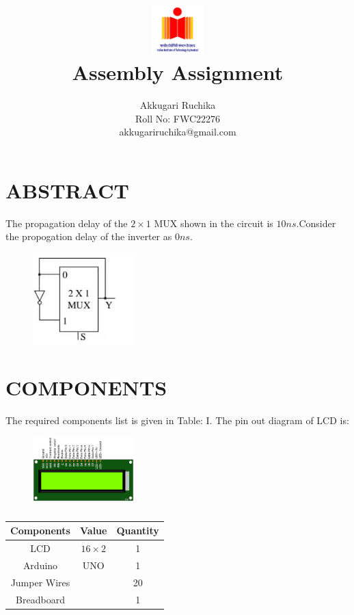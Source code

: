 \documentclass[conference]{IEEEtran}
\title{
\vspace{1cm}
{\includegraphics[width=0.15\textwidth]{iithlogo.jpg} \\ Assembly Assignment} }
\author{Akkugari Ruchika \\ Roll No: FWC22276 \\ akkugariruchika@gmail.com}
\begin{document}
\maketitle
 \section {ABSTRACT}
 The propagation delay of the $2 \times 1$ MUX shown in the circuit is $10ns$.Consider the propogation delay of the inverter as $0ns$. 
 \begin {figure}[h]
 \centering
 \includegraphics[width=0.35\textwidth]{as11.jpg}
 \caption{\label{fig: $2 \times 1$ MUX}}
 \end {figure}
\section{COMPONENTS}
The required components list is given in Table: I. The pin out diagram of LCD is:
 \begin{figure}[h]
	 \centering
	 \includegraphics[width=0.35\textwidth]{lcd.png}
	 \caption{\label{fig:LCD}}
 \end{figure}
  \begin{table} [htbp]
\centering
\begin{tabular}{| c | c | c |} \hline
Components & Value & Quantity \\\hline
	LCD & $16\times2$ & 1 \\ \hline
Arduino & UNO & 1 \\ \hline
Jumper Wires &  & 20 \\ \hline
Breadboard & & 1 \\ 
\hline
\end{tabular}
\vspace{0.1cm}
\caption{\label{tab:widgets}}
\end{table}\\
\end{document}
